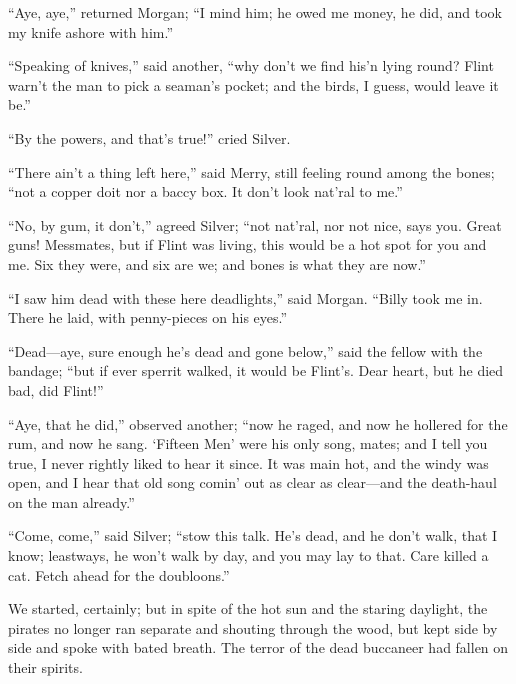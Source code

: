 \enquote{Aye, aye,} returned Morgan; \enquote{I mind him; he owed me money, he did, and took my knife ashore with him.}

\enquote{Speaking of knives,} said another, \enquote{why don’t we find his’n lying round? Flint warn’t the man to pick a seaman’s pocket; and the birds, I guess, would leave it be.}

\enquote{By the powers, and that’s true!} cried Silver.

\enquote{There ain’t a thing left here,} said Merry, still feeling round among the bones; \enquote{not a copper doit nor a baccy box. It don’t look nat’ral to me.}

\enquote{No, by gum, it don’t,} agreed Silver; \enquote{not nat’ral, nor not nice, says you. Great guns! Messmates, but if Flint was living, this would be a hot spot for you and me. Six they were, and six are we; and bones is what they are now.}

\enquote{I saw him dead with these here deadlights,} said Morgan. \enquote{Billy took me in. There he laid, with penny-pieces on his eyes.}

\enquote{Dead---aye, sure enough he’s dead and gone below,} said the fellow with the bandage; \enquote{but if ever sperrit walked, it would be Flint’s. Dear heart, but he died bad, did Flint!}

\enquote{Aye, that he did,} observed another; \enquote{now he raged, and now he hollered for the rum, and now he sang. \enquote{Fifteen Men} were his only song, mates; and I tell you true, I never rightly liked to hear it since. It was main hot, and the windy was open, and I hear that old song comin’ out as clear as clear---and the death-haul on the man already.}

\enquote{Come, come,} said Silver; \enquote{stow this talk. He’s dead, and he don’t walk, that I know; leastways, he won’t walk by day, and you may lay to that. Care killed a cat. Fetch ahead for the doubloons.}

We started, certainly; but in spite of the hot sun and the staring daylight, the pirates no longer ran separate and shouting through the wood, but kept side by side and spoke with bated breath. The terror of the dead buccaneer had fallen on their spirits.